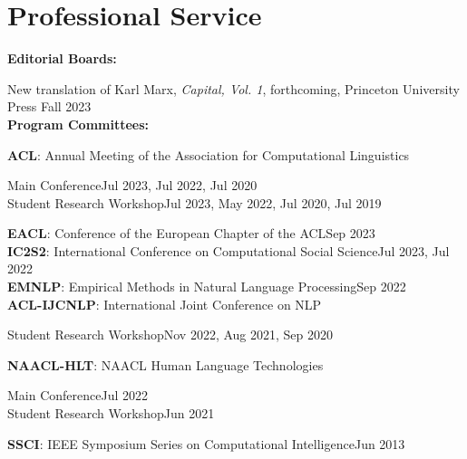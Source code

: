 \documentclass[letterpaper,11pt]{article}
\newcommand{\cvitemsep}{2mm}
\begin{document}
\begin{minipage}{\textwidth}
\section{Professional Service}

\textbf{Editorial Boards:}\vspace{\cvitemsep}

New translation of Karl Marx, \textit{Capital, Vol. 1}, forthcoming, Princeton University Press \hfill Fall 2023\vspace{2mm}\\

\textbf{Program Committees:}\vspace{\cvitemsep}

\textbf{ACL}: Annual Meeting of the Association for Computational Linguistics \\
\begin{adjustwidth}{1cm}{}
	Main Conference\hfill Jul 2023, Jul 2022, Jul 2020 \\
	Student Research Workshop\hfill Jul 2023, May 2022, Jul 2020, Jul 2019\vspace{1mm}\\
\end{adjustwidth}
\textbf{EACL}: Conference of the European Chapter of the ACL\hfill Sep 2023\vspace{1mm} \\
\textbf{IC2S2}: International Conference on Computational Social Science\hfill Jul 2023, Jul 2022\vspace{1mm}\\
\textbf{EMNLP}: Empirical Methods in Natural Language Processing\hfill Sep 2022\vspace{1mm} \\
\textbf{ACL-IJCNLP}: International Joint Conference on NLP \\
\begin{adjustwidth}{1cm}{}
	Student Research Workshop\hfill Nov 2022, Aug 2021, Sep 2020\vspace{1mm}\\
\end{adjustwidth}

\textbf{NAACL-HLT}: NAACL Human Language Technologies \\
\begin{adjustwidth}{1cm}{}
	Main Conference\hfill Jul 2022 \\
	Student Research Workshop\hfill Jun 2021
\end{adjustwidth}

\textbf{SSCI}: IEEE Symposium Series on Computational Intelligence\hfill Jun 2013\vspace{2mm}


\end{minipage}
\end{document}
